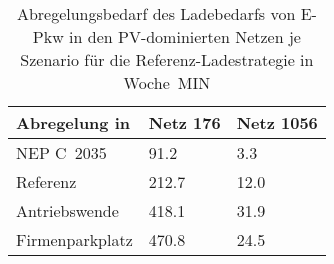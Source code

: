 {
\renewcommand{\arraystretch}{1.2}%
\begin{table}[H]
	\begin{center}
		\caption{Abregelungsbedarf des Ladebedarfs von E-Pkw in den PV-dominierten Netzen je Szenario für die Referenz-Ladestrategie in Woche~MIN}
		\begin{tabu} to 0.6\textwidth {X[1.5] X[1, r] X[1, r]}
			\toprule
			Abregelung in   \si{\mwh}    & Netz \num{176} & Netz \num{1056} \\ \midrule
			NEP C~\num{2035}             & \num{91.2}     & \num{3.3}       \\
			Referenz                     & \num{212.7}    & \num{12.0}      \\
			Antriebswende                & \num{418.1}    & \num{31.9}      \\
			\glqq Firmenparkplatz\grqq{} & \num{470.8}    & \num{24.5}      \\ \bottomrule
		\end{tabu}
		\label{tab:pv_dominated_week_a_epkw_cur}
	\end{center}
	\vspace{-3mm}%
\end{table}
}